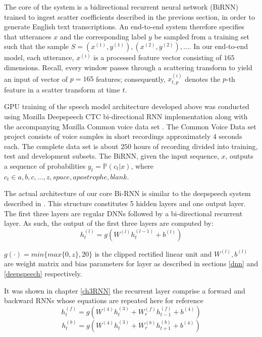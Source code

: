The core of the system is a bidirectional recurrent neural network (BiRNN) trained to ingest scatter coefficients described in the previous section, in order to generate English text transcriptions.  An end-to-end system therefore specifies that utterances $x$ and the corresponding label $y$ be sampled from a training set such that the sample $S = {(x^{(1)}, y^{(1)}), (x^{(2)}, y^{(2)}), . . .}$.   In our end-to-end model, each utterance, $x^{(i)}$ is a processed feature vector consisting of $165$ dimensions.  Recall, every window passes through a scattering transform to yield an input of vector of $p=165$ features; consequently,   $x^{(i)}_{t,p}$ denotes the $p$-th feature in a scatter transform at time $t$.  

GPU training of the speech model architecture developed above was conducted using Mozilla Deepspeech \citep{mozilla_2019} CTC bi-directional RNN implementation along with the accompanying Mozilla Common voice data set  \citep{ardila2019common}.  The Common Voice Data set project consists of voice samples in short recordings approximately $4$ seconds each.  The complete data set is about $250$ hours of recording divided into training, test and development subsets.  The BiRNN, given the input sequence, $x$, outputs a sequence of probabilities $y_t=\mathbb{P}(c_t|x)$,  where $c_t \in a,b,c,\dots,z,space,apostrophe,blank$. 

The actual architecture of our core Bi-RNN is similar to the deepspeech system described in \cite{hannun2014deep}. This structure constitutes 5 hidden layers and one output layer.  The first three layers are regular DNNs followed by a bi-directional recurrent layer. As such, the output of the first three layers are computed by:
\begin{equation}
    h^{(l)}_t = g(W^{(l)} h^{(l−1)}_t + b^{(l)})\label{ch06_01_l1-3}
\end{equation}

$g(\cdot) = min\{max\{0,z\},20\}$  is the clipped rectified linear unit and $W^{(l)},b^{(l)}$ are weight matrix and bias parameters for layer  as described in sections \ref{dnn} and \ref{deepspeech} respectively.

It was shown in chapter \ref{ch3RNN} the recurrent layer comprise a forward and backward RNNs whose equations are repeated here for reference
\begin{equation}
    h^{(f)}_t = g(W^{(4)} h^{(3)}_t + W^{(f)}_r h^{(f)}_{t−1} + b^{(4)})
    \label{ch06_02_fwd}
\end{equation}
\begin{equation}
h^{(b)}_t = g(W^{(4)} h^{(3)}_t + W^{(b)}_r h^{(b)}_{t+1} + b^{(4)})    \label{ch06_03_bwd}
\end{equation}

